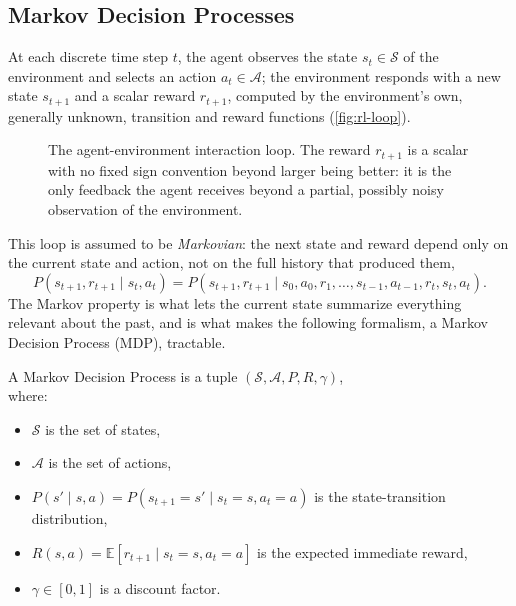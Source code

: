 \subsection{Markov Decision Processes}

At each discrete time step $t$, the agent observes the state $s_t \in \mathcal{S}$ of the environment and selects an action $a_t \in \mathcal{A}$; the environment responds with a new state $s_{t+1}$ and a scalar reward $r_{t+1}$, computed by the environment's own, generally unknown, transition and reward functions (\autoref{fig:rl-loop}).

\begin{figure}[htbp]
\centering
{}
\caption[The agent-environment interaction loop]{The agent-environment interaction loop. The reward $r_{t+1}$ is a scalar with no fixed sign convention beyond larger being better: it is the only feedback the agent receives beyond a partial, possibly noisy observation of the environment.}
\label{fig:rl-loop}
\end{figure}

This loop is assumed to be \emph{Markovian}: the next state and reward depend only on the current state and action, not on the full history that produced them,
\begin{equation}
P(s_{t+1}, r_{t+1} \mid s_t, a_t) = P(s_{t+1}, r_{t+1} \mid s_0, a_0, r_1, \dots, s_{t-1}, a_{t-1}, r_t, s_t, a_t).
\end{equation}
The Markov property is what lets the current state summarize everything relevant about the past, and is what makes the following formalism, a Markov Decision Process (MDP), tractable.

\begin{definition}
A Markov Decision Process is a tuple $(\mathcal{S}, \mathcal{A}, P, R, \gamma)$, \\
where: 
\begin{itemize}
    \item $\mathcal{S}$ is the set of states,
    \item $\mathcal{A}$ is the set of actions,
    \item $P(s' \mid s, a) = P(s_{t+1}{=}s' \mid s_t{=}s, a_t{=}a)$ is the state-transition distribution,
    \item $R(s,a) = \mathbb{E}[r_{t+1} \mid s_t{=}s, a_t{=}a]$ is the expected immediate reward,
    \item $\gamma \in [0,1]$ is a discount factor.
\end{itemize}
\end{definition}

